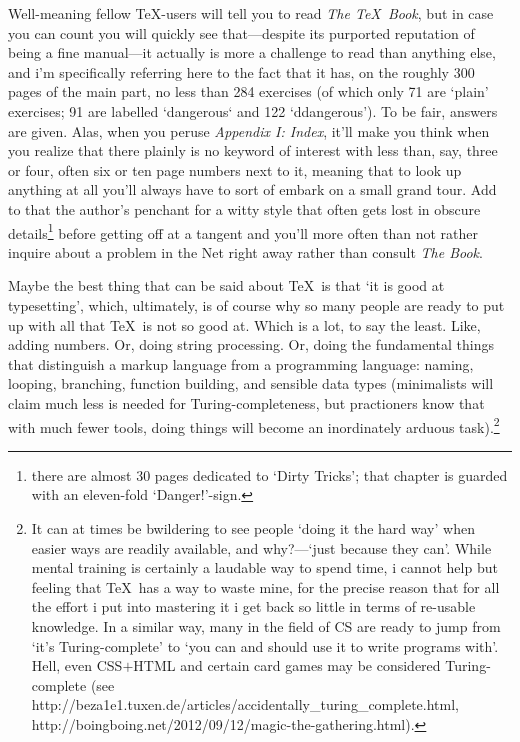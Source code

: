 Well-meaning fellow \TeX-users will tell you to read {\em The \TeX\ Book}, but in case you can count you will
quickly see that---despite its purported reputation of being a fine manual---it actually is more a challenge to
read than anything else, and i'm specifically referring here to the fact that it has, on the roughly 300
pages of the main part, no less than 284 exercises (of which only 71 are `plain' exercises; 91 are labelled
`dangerous` and 122 `ddangerous'). To be fair, answers are given. Alas, when you peruse {\em Appendix I:
Index}, it'll make you think when you realize that there plainly is no keyword of interest with less than, say,
three or four, often six or ten page numbers next to it, meaning that to look up anything at all
you'll always have to sort of embark on a small grand tour. Add to that the author's penchant for a witty style
that often gets lost in obscure details\footnote{there are almost 30 pages dedicated to `Dirty Tricks';
that chapter is guarded with an eleven-fold `Danger!'-sign.} before getting off at a tangent and you'll more often than not rather inquire
about a problem in the Net right away rather than consult {\em The Book}.

Maybe the best thing that can be said about \TeX\ is that `it is good at typesetting', which, ultimately, is
of course why so many people are ready to put up with all that \TeX\ is not so good at. Which is a lot, to
say the least. Like, adding numbers. Or, doing string processing. Or, doing the fundamental things that
distinguish a markup language from a programming language: naming, looping, branching, function building,
and sensible data types (minimalists will claim much less is needed for Turing-completeness, but practioners
know that with much fewer tools, doing things will become an inordinately arduous task).\footnote{It can at
times be bwildering to see people `doing it the hard way' when easier ways are readily available, and
why?---`just because they can'. While mental training is certainly a laudable way to spend time, i cannot
help but feeling that \TeX\ has a way to waste mine, for the precise reason that for all the effort i put
into mastering it i get back so little in terms of re-usable knowledge. In a similar way, many in the field
of CS are ready to jump from `it's Turing-complete' to `you can and should use it to write programs with'.
Hell, even CSS$+$HTML and certain card games may be considered Turing-complete (see
http://beza1e1.tuxen.de/articles/accidentally\_turing\_complete.html, http://boingboing.net/2012/09/12/magic-the-gathering.html).}

